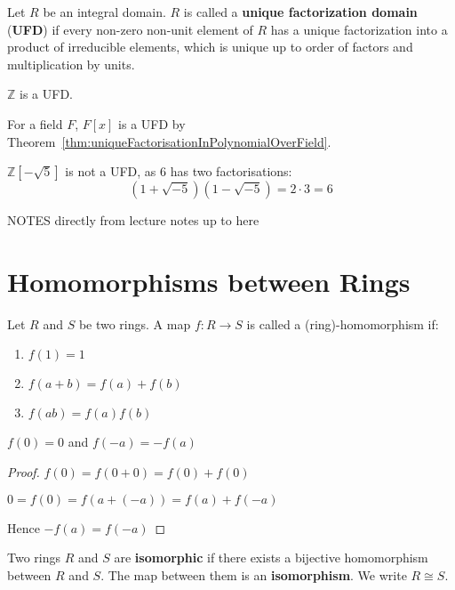 \begin{definition}
	Let $R$ be an integral domain. $R$ is called a \textbf{unique factorization domain} (\textbf{UFD}) if every non-zero non-unit element of $R$ has a unique factorization into a product of irreducible elements, which is unique up to order of factors and multiplication by units.
\end{definition}

\begin{example}
	$\mathbb{Z}$ is a UFD.
\end{example}

\begin{example}
	For a field $F$, $F[x]$ is a UFD by Theorem~\ref{thm:uniqueFactorisationInPolynomialOverField}.
\end{example}

\begin{example}
	$\mathbb{Z}[-\sqrt{5}]$ is not a UFD, as $6$ has two factorisations:
	\[
		(1 + \sqrt{-5}) (1 - \sqrt{-5}) = 2 \cdot 3 = 6
	\]
\end{example}

NOTES directly from lecture notes up to here

\section{Homomorphisms between Rings}	

Let $R$ and $S$ be two rings. A map $f: R \rightarrow S$ is called a (ring)-homomorphism if:
\begin{enumerate}
	\item $f(1) = 1$
	\item $f(a + b) = f(a) + f(b)$
	\item $f(ab) = f(a)f(b)$
\end{enumerate}

\begin{lemma}
	$f(0) = 0$ and $f(-a) = -f(a)$
\end{lemma}

\begin{proof}
	$f(0) = f(0 + 0) = f(0) + f(0)$

	$0 = f(0) = f(a + (-a)) = f(a) + f(-a)$

	Hence $-f(a) = f(-a)$
\end{proof}

\begin{definition}
	Two rings $R$ and $S$ are \textbf{isomorphic} if there exists a bijective homomorphism between $R$ and $S$. The map between them is an \textbf{isomorphism}. We write $R \cong S$.
\end{definition}

